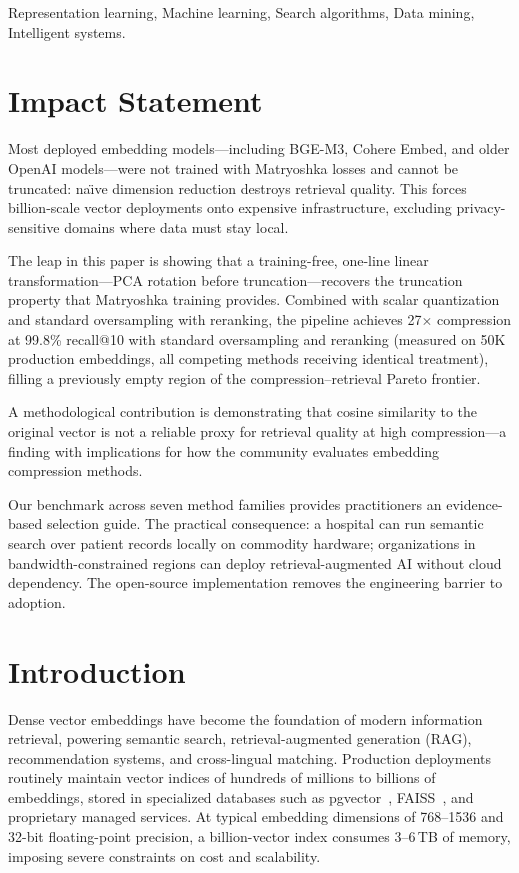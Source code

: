 \documentclass[journal]{IEEEtran}
\begin{document}
\begin{IEEEkeywords}
Representation learning, Machine learning, Search algorithms, Data mining, Intelligent systems.
\end{IEEEkeywords}

\section*{Impact Statement}

Most deployed embedding models---including BGE-M3, Cohere Embed, and
older OpenAI models---were not trained with Matryoshka losses and
cannot be truncated: na\"{\i}ve dimension reduction destroys retrieval
quality.  This forces billion-scale vector deployments onto expensive
infrastructure, excluding privacy-sensitive domains where data must
stay local.

The leap in this paper is showing that a training-free, one-line
linear transformation---PCA rotation before truncation---recovers the
truncation property that Matryoshka training provides.  Combined with
scalar quantization and standard oversampling with reranking, the
pipeline achieves 27$\times$ compression at 99.8\% recall@10 with
standard oversampling and reranking (measured on 50K production
embeddings, all competing methods receiving identical treatment),
filling a previously empty region of the compression--retrieval
Pareto frontier.

A methodological contribution is demonstrating that cosine similarity
to the original vector is not a reliable proxy for retrieval quality
at high compression---a finding with implications for how the
community evaluates embedding compression methods.

Our benchmark across seven method families provides practitioners an
evidence-based selection guide.  The practical consequence: a hospital
can run semantic search over patient records locally on commodity
hardware; organizations in bandwidth-constrained regions can deploy
retrieval-augmented AI without cloud dependency.  The open-source
implementation removes the engineering barrier to adoption.

\section{Introduction}
\label{sec:introduction}

Dense vector embeddings have become the foundation of modern information retrieval, powering semantic search, retrieval-augmented generation (RAG), recommendation systems, and cross-lingual matching.
Production deployments routinely maintain vector indices of hundreds of millions to billions of embeddings, stored in specialized databases such as pgvector~\cite{pgvector2023}, FAISS~\cite{johnson2019faiss,douze2024faiss}, and proprietary managed services.
At typical embedding dimensions of 768--1536 and 32-bit floating-point precision, a billion-vector index consumes 3--6\,TB of memory, imposing severe constraints on cost and scalability.
\end{document}
